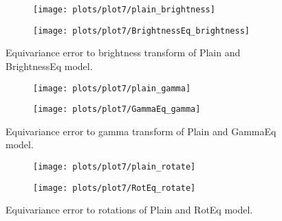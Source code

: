     \begin{figure}[h!]
    \begin{adjustwidth}{-11em}{-11em}
        \centering
        \begin{subfigure}{0.4\textwidth}
            \texttt{[image: plots/plot7/plain\_brightness]}
        \end{subfigure}
        \begin{subfigure}{0.4\textwidth}
            \texttt{[image: plots/plot7/BrightnessEq\_brightness]}
        \end{subfigure}
    \end{adjustwidth}
        \caption{Equivariance error to brightness transform of Plain and BrightnessEq
        model.}
        \label{fig:plot7brightness}
    \end{figure}

    \begin{figure}[h!]
    \begin{adjustwidth}{-11em}{-11em}
        \centering
        \begin{subfigure}{0.4\textwidth}
            \texttt{[image: plots/plot7/plain\_gamma]}
        \end{subfigure}
        \begin{subfigure}{0.4\textwidth}
            \texttt{[image: plots/plot7/GammaEq\_gamma]}
        \end{subfigure}
    \end{adjustwidth}
        \caption{Equivariance error to gamma transform of Plain and GammaEq
        model.}
        \label{fig:plot7gamma}
    \end{figure}

    \begin{figure}[h!]
    \begin{adjustwidth}{-11em}{-11em}
        \centering
        \begin{subfigure}{0.6\textwidth}
            \texttt{[image: plots/plot7/plain\_rotate]}
        \end{subfigure}
        \begin{subfigure}{0.6\textwidth}
            \texttt{[image: plots/plot7/RotEq\_rotate]}
        \end{subfigure}
    \end{adjustwidth}
        \caption{Equivariance error to rotations of Plain and RotEq
        model.}
        \label{fig:plot7rot}
    \end{figure}



